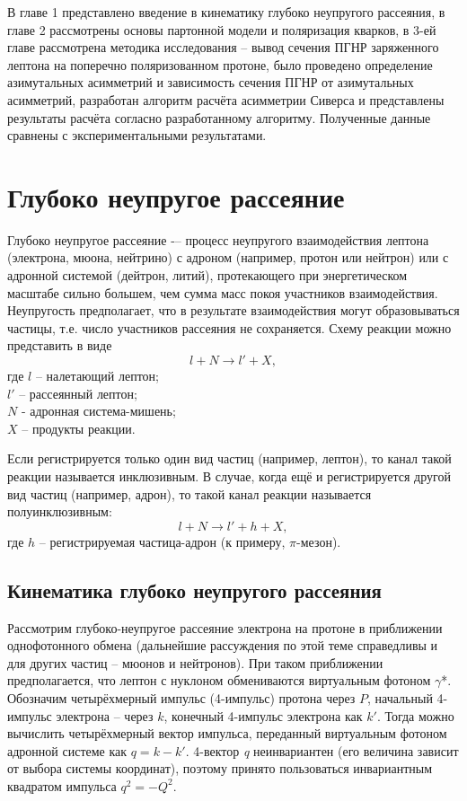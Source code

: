 \documentclass{extreport}
\begin{document}
В главе 1 представлено введение в кинематику глубоко неупругого рассеяния, в главе 2 рассмотрены основы партонной модели и поляризация кварков, в 3-ей главе рассмотрена методика исследования -- вывод сечения ПГНР заряженного лептона на поперечно поляризованном протоне, было проведено определение азимутальных асимметрий и зависимость сечения ПГНР от азимутальных асимметрий, разработан алгоритм расчёта асимметрии Сиверса и представлены результаты расчёта согласно разработанному алгоритму. Полученные данные сравнены с экспериментальными результатами.

\newpage
\chapter{Глубоко неупругое рассеяние}
\thispagestyle{myheadings}
Глубоко неупругое рассеяние -– процесс неупругого взаимодействия лептона (электрона, мюона, нейтрино) с адроном (например, протон или нейтрон) или с адронной системой (дейтрон, литий), протекающего при энергетическом масштабе сильно большем, чем сумма масс покоя участников взаимодействия. Неупругость предполагает, что в результате взаимодействия могут образовываться частицы, т.е. число участников рассеяния не сохраняется. Схему реакции можно представить в виде
\begin{equation}
	l + N \rightarrow l' + X,
\end{equation}
где $l$ -- налетающий лептон; \\ $l'$ -- рассеянный лептон; \\ $N$ - адронная система-мишень; \\ $X$ -- продукты реакции. 

Если регистрируется только один вид частиц (например, лептон), то канал такой реакции называется инклюзивным. В случае, когда ещё и регистрируется другой вид частиц (например, адрон), то такой канал реакции называется полуинклюзивным:
\begin{equation}
	l + N \rightarrow l' + h + X,
\end{equation}
где $h$ -- регистрируемая частица-адрон (к примеру, $\pi$-мезон). 
\section{Кинематика глубоко неупругого рассеяния}
Рассмотрим глубоко-неупругое рассеяние электрона на протоне в приближении однофотонного обмена (дальнейшие рассуждения по этой теме справедливы и для других частиц – мюонов и нейтронов). При таком приближении предполагается, что лептон с нуклоном обмениваются виртуальным фотоном $\gamma$*. Обозначим четырёхмерный импульс (4-импульс) протона через $P$, начальный 4-импульс электрона – через $k$,  конечный 4-импульс электрона как $k'$. Тогда можно вычислить четырёхмерный вектор импульса, переданный виртуальным фотоном адронной системе как $q=k-k'$. 4-вектор \textit{q} неинвариантен (его величина зависит от выбора системы координат), поэтому принято пользоваться инвариантным квадратом импульса $q^2=-Q^2$.
\end{document}

